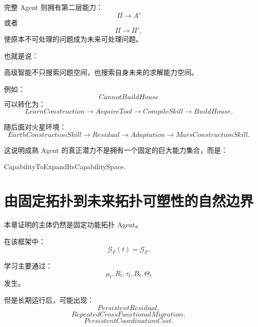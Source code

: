 完整 Agent 则拥有第二层能力：
\begin{equation}
\Pi
\rightarrow
A'
\end{equation}
或者
\begin{equation}
\Pi
\rightarrow
\Pi',
\end{equation}
使原本不可处理的问题成为未来可处理问题。

也就是说：
\begin{statementbox}
高级智能不只搜索问题空间，也搜索自身未来的求解能力空间。
\end{statementbox}

例如：
\begin{equation}
CannotBuildHouse
\end{equation}
可以转化为：
\begin{equation}
LearnConstruction
\rightarrow
AcquireTool
\rightarrow
CompileSkill
\rightarrow
BuildHouse.
\end{equation}

随后面对火星环境：
\begin{equation}
EarthConstructionSkill
\rightarrow
Residual
\rightarrow
Adaptation
\rightarrow
MarsConstructionSkill.
\end{equation}

这说明成熟 Agent 的真正潜力不是拥有一个固定的巨大能力集合，而是：

\begin{statementbox}
CapabilityToExpandItsCapabilitySpace.
\end{statementbox}

\section{由固定拓扑到未来拓扑可塑性的自然边界}

本章证明的主体仍然是固定功能拓扑 Agent。

在该框架中：
\begin{equation}
\mathcal G_F(t)
=
\mathcal G_F.
\end{equation}

学习主要通过：
\begin{equation}
\mu_t,
R_t,
\tau_t,
B_t,
\Theta_t
\end{equation}
发生。

但是长期运行后，可能出现：
\begin{equation}
PersistentResidual,
\end{equation}
\begin{equation}
RepeatedCrossFunctionalMigration,
\end{equation}
\begin{equation}
PersistentCoordinationCost.
\end{equation}

